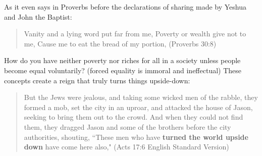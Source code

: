 \documentclass[11pt]{article}
\begin{document}
As it even says in Proverbs before the declarations of sharing made by Yeshua and John the Baptist: 
\begin{quote}
Vanity and a lying word put far from me, Poverty or wealth give not to me, Cause me to eat the bread of my portion, (Proverbs 30:8)
\end{quote}
How do you have neither poverty nor riches for all in a society unless people become equal voluntarily? (forced equality is immoral and ineffectual) These concepts create a reign that truly turns things upside-down:
\begin{quote}
But the Jews were jealous, and taking some wicked men of the rabble, they formed a mob, set the city in an uproar, and attacked the house of Jason, seeking to bring them out to the crowd. And when they could not find them, they dragged Jason and some of the brothers before the city authorities, shouting, “These men who have  \textbf{turned the world upside down} have come here also," (Acts 17:6 English Standard Version)
\end{quote}
\end{document}
